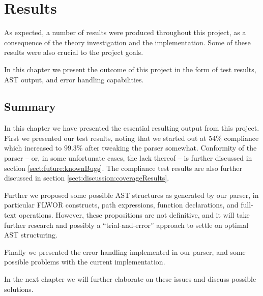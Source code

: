 \chapter{Results}
\label{chapter:results}
As expected, a number of results were produced throughout this project, as a
consequence of the theory investigation and the implementation. Some of these
results were also crucial to the project goals. 

In this chapter we present the outcome of this project in the form of test
results, AST output, and error handling capabilities. 




\section{Summary}
In this chapter we have presented the essential resulting output from this
project. First we presented our test results, noting that we started out at   
54\% compliance which increased to 99.3\% after tweaking the parser somewhat.
Conformity of the parser -- or, in some unfortunate cases, the lack thereof -- is
further  discussed in section \ref{sect:future:knownBugs}. The compliance test
results are also further discussed in section
\ref{sect:discussion:coverageResults}.

Further we proposed some possible AST structures as generated by our parser, in
particular FLWOR constructs, path expressions, function declarations, and
full-text operations. However, these propositions are not definitive, and it
will take further research and possibly a ``trial-and-error'' approach to settle
on optimal AST structuring.

Finally we presented the error handling implemented in our parser, and some
possible problems with the current implementation. 

In the next chapter we will further elaborate on these issues and discuss
possible solutions.
